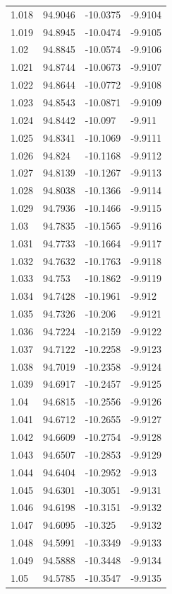 \begin{tabular}{llll}
1.018 & 94.9046 & -10.0375 & -9.9104 \\
1.019 & 94.8945 & -10.0474 & -9.9105 \\
1.02 & 94.8845 & -10.0574 & -9.9106 \\
1.021 & 94.8744 & -10.0673 & -9.9107 \\
1.022 & 94.8644 & -10.0772 & -9.9108 \\
1.023 & 94.8543 & -10.0871 & -9.9109 \\
1.024 & 94.8442 & -10.097 & -9.911 \\
1.025 & 94.8341 & -10.1069 & -9.9111 \\
1.026 & 94.824 & -10.1168 & -9.9112 \\
1.027 & 94.8139 & -10.1267 & -9.9113 \\
1.028 & 94.8038 & -10.1366 & -9.9114 \\
1.029 & 94.7936 & -10.1466 & -9.9115 \\
1.03 & 94.7835 & -10.1565 & -9.9116 \\
1.031 & 94.7733 & -10.1664 & -9.9117 \\
1.032 & 94.7632 & -10.1763 & -9.9118 \\
1.033 & 94.753 & -10.1862 & -9.9119 \\
1.034 & 94.7428 & -10.1961 & -9.912 \\
1.035 & 94.7326 & -10.206 & -9.9121 \\
1.036 & 94.7224 & -10.2159 & -9.9122 \\
1.037 & 94.7122 & -10.2258 & -9.9123 \\
1.038 & 94.7019 & -10.2358 & -9.9124 \\
1.039 & 94.6917 & -10.2457 & -9.9125 \\
1.04 & 94.6815 & -10.2556 & -9.9126 \\
1.041 & 94.6712 & -10.2655 & -9.9127 \\
1.042 & 94.6609 & -10.2754 & -9.9128 \\
1.043 & 94.6507 & -10.2853 & -9.9129 \\
1.044 & 94.6404 & -10.2952 & -9.913 \\
1.045 & 94.6301 & -10.3051 & -9.9131 \\
1.046 & 94.6198 & -10.3151 & -9.9132 \\
1.047 & 94.6095 & -10.325 & -9.9132 \\
1.048 & 94.5991 & -10.3349 & -9.9133 \\
1.049 & 94.5888 & -10.3448 & -9.9134 \\
1.05 & 94.5785 & -10.3547 & -9.9135 \\

\end{tabular}
